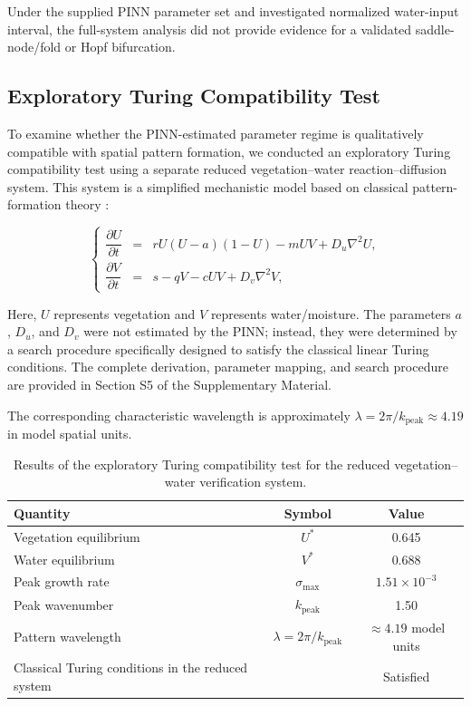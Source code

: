 \documentclass[preprint,review,12pt,3p]{elsarticle}
\begin{document}
	Under the supplied PINN parameter set and investigated normalized water-input interval, the full-system analysis did not provide evidence for a validated saddle-node/fold or Hopf bifurcation.
	
\subsection{Exploratory Turing Compatibility Test}
\label{subsec:turing}

To examine whether the PINN-estimated parameter regime is qualitatively compatible with spatial pattern formation, we conducted an exploratory Turing compatibility test using a separate reduced vegetation--water reaction--diffusion system. This system is a simplified mechanistic model based on classical pattern-formation theory \citep{turing1952chemical,rietkerk2008regular,meron2012pattern}:

\begin{equation}
	\left\{
	\begin{array}{rcl}
		\dfrac{\partial U}{\partial t} &=& r U (U - a)(1 - U) - m U V + D_u \nabla^2 U, \\[0.4cm]
		\dfrac{\partial V}{\partial t} &=& s - q V - c U V + D_v \nabla^2 V,
	\end{array}
	\right.
	\label{eq:turing_system}
\end{equation}

Here, \(U\) represents vegetation and \(V\) represents water/moisture. The parameters \(a\), \(D_u\), and \(D_v\) were not estimated by the PINN; instead, they were determined by a search procedure specifically designed to satisfy the classical linear Turing conditions. The complete derivation, parameter mapping, and search procedure are provided in Section S5 of the Supplementary Material.

	The corresponding characteristic wavelength is approximately \(\lambda = 2\pi/k_{\mathrm{peak}} \approx 4.19\) in model spatial units.

\begin{table}[htbp]
	\centering
	\caption{Results of the exploratory Turing compatibility test for the reduced vegetation--water verification system.}
	\label{tab:turing_results}
	\begin{tabular}{lcc}
		\toprule
		Quantity & Symbol & Value \\
		\midrule
		Vegetation equilibrium & $U^*$ & 0.645 \\
		Water equilibrium & $V^*$ & 0.688 \\
		Peak growth rate & $\sigma_{\max}$ & $1.51\times10^{-3}$ \\
		Peak wavenumber & $k_{\text{peak}}$ & 1.50 \\
		Pattern wavelength & $\lambda = 2\pi/k_{\text{peak}}$ & $\approx 4.19$ model units \\
		Classical Turing conditions in the reduced system & & Satisfied \\
		\bottomrule
	\end{tabular}
\end{table}
\end{document}
